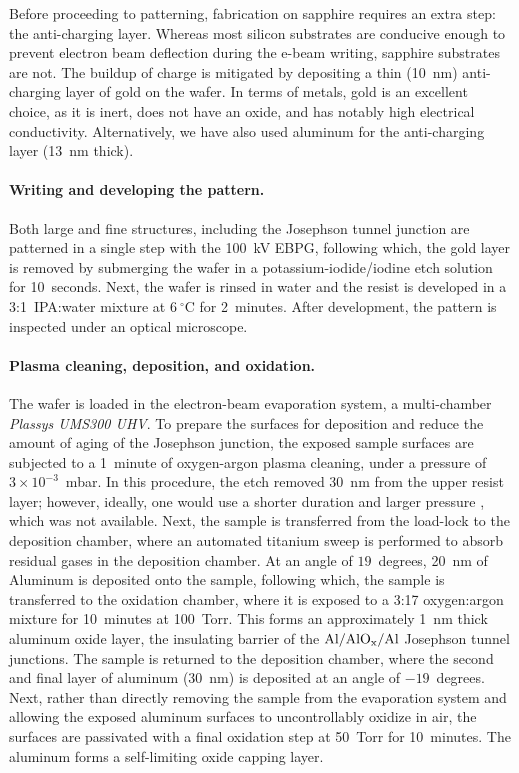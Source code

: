 Before proceeding to patterning, fabrication on sapphire requires
an extra step: the anti-charging layer. Whereas most silicon substrates
are conducive enough to prevent electron beam deflection during the
e-beam writing, sapphire substrates are not. The buildup of charge
is mitigated by depositing  a thin (10~nm) anti-charging layer of
gold on the wafer. In terms of metals, gold is an excellent choice,
as it is inert, does not have an oxide, and has notably high electrical
conductivity. Alternatively, we have also used aluminum for the anti-charging
layer (13~nm thick). 

\paragraph{Writing and developing the pattern. }

Both large and fine structures, including the Josephson tunnel junction
are patterned in a single step with the 100~kV EBPG, following which,
the gold layer is removed by submerging the wafer in a potassium-iodide/iodine
etch solution for 10~seconds. Next, the wafer is rinsed in water
and the resist is developed in a 3:1~IPA:water mixture at $6~\ensuremath{^{\circ}}\text{C}$
for 2~minutes. After development, the pattern is inspected under
an optical microscope. 


\paragraph{Plasma cleaning, deposition, and oxidation. }

The wafer is loaded in the electron-beam evaporation system, a multi-chamber\emph{
Plassys UMS300 UHV}. To prepare the surfaces for deposition and reduce
the amount of aging of the Josephson junction, the exposed sample
surfaces are subjected to a 1~minute of oxygen-argon plasma cleaning,
under a pressure of $3\times10^{-3}$~mbar. In this procedure, the
etch removed 30~nm from the upper resist layer; however, ideally,
one would use a shorter duration and larger pressure \citep{Pop2012-Junction},
which was not available. Next, the sample is transferred from the
load-lock to the deposition chamber, where an automated titanium sweep
is performed to absorb residual gases in the deposition chamber. 
At an angle of $19$~degrees, 20~nm of Aluminum is deposited onto
the sample, following which, the sample is transferred to the oxidation
chamber, where it is exposed to a 3:17 oxygen:argon mixture for 10~minutes
at 100~Torr. This forms an approximately 1~nm thick aluminum oxide
layer, the insulating barrier of the $\text{Al/Al\ensuremath{\mathrm{O}_{\mathrm{x}}}/Al}$
Josephson tunnel junctions. The sample is returned to the deposition
chamber, where the second and final layer of aluminum (30~nm) is
deposited at an angle of $-19$~degrees. Next, rather than directly
removing the sample from the evaporation system and allowing the exposed
aluminum surfaces to uncontrollably oxidize in air, the surfaces are
passivated with a final oxidation step at 50~Torr for 10~minutes.
The aluminum forms a self-limiting oxide capping layer.

